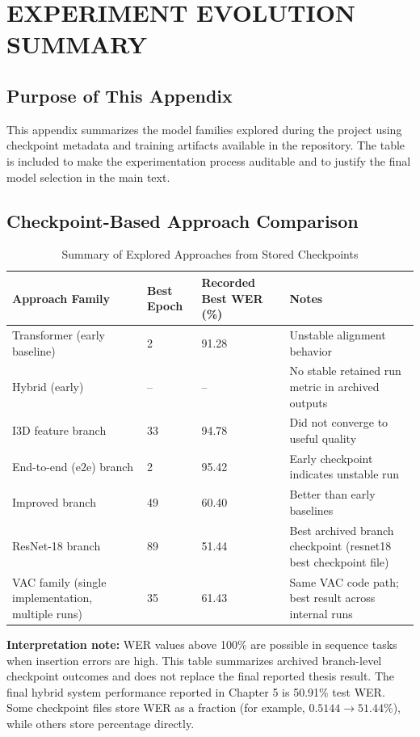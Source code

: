 \chapter{EXPERIMENT EVOLUTION SUMMARY}

\section{Purpose of This Appendix}

This appendix summarizes the model families explored during the project using checkpoint metadata and training artifacts available in the repository. The table is included to make the experimentation process auditable and to justify the final model selection in the main text.

\section{Checkpoint-Based Approach Comparison}

\begin{table}[H]
\centering
\caption{Summary of Explored Approaches from Stored Checkpoints}
\label{tab:checkpoint_summary}
\begingroup
\footnotesize
\setlength{\tabcolsep}{4pt}
\begin{tabularx}{\textwidth}{@{}p{2.9cm}p{1.5cm}p{2.8cm}X@{}}
\toprule
\textbf{Approach Family} & \textbf{Best Epoch} & \textbf{Recorded Best WER (\%)} & \textbf{Notes} \\
\midrule
Transformer (early baseline) & 2 & 91.28 & Unstable alignment behavior \\
Hybrid (early) & -- & -- & No stable retained run metric in archived outputs \\
I3D feature branch & 33 & 94.78 & Did not converge to useful quality \\
End-to-end (e2e) branch & 2 & 95.42 & Early checkpoint indicates unstable run \\
Improved branch & 49 & 60.40 & Better than early baselines \\
ResNet-18 branch & 89 & 51.44 & Best archived branch checkpoint (resnet18 best checkpoint file) \\
VAC family (single implementation, multiple runs) & 35 & 61.43 & Same VAC code path; best result across internal runs \\
\bottomrule
\end{tabularx}
\endgroup
\end{table}

\noindent\textbf{Interpretation note:} WER values above 100\% are possible in sequence tasks when insertion errors are high. This table summarizes archived branch-level checkpoint outcomes and does not replace the final reported thesis result. The final hybrid system performance reported in Chapter 5 is 50.91\% test WER. Some checkpoint files store WER as a fraction (for example, $0.5144 \rightarrow 51.44\%$), while others store percentage directly.

